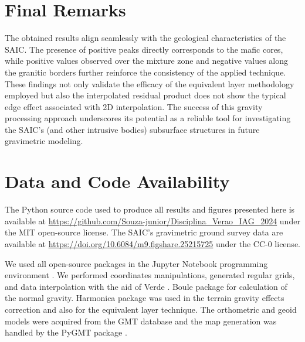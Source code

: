 \section{Final Remarks}
The obtained results align seamlessly with the geological characteristics of the SAIC. The presence of positive peaks directly corresponds to the mafic cores, while positive values observed over the mixture zone and negative values along the granitic borders further reinforce the consistency of the applied technique. These findings not only validate the efficacy of the equivalent layer methodology employed but also the interpolated residual product does not show the typical edge effect associated with 2D interpolation. The success of this gravity processing approach underscores its potential as a reliable tool for investigating the SAIC's (and other intrusive bodies) subsurface structures in future gravimetric modeling.

\newpage
\section*{Data and Code Availability}

The Python source code used to produce all results and figures presented here is available at \url{https://github.com/Souza-junior/Disciplina_Verao_IAG_2024} under the MIT open-source license. The SAIC's gravimetric ground survey data are available at \url{https://doi.org/10.6084/m9.figshare.25215725} under the CC-0 license.


We used all open-source packages in the Jupyter Notebook programming environment \citep{Kluyver2016}. We performed coordinates manipulations, generated regular grids, and data interpolation with the aid of Verde \citep{verde2018}. Boule package \citep{Boule2020} for calculation of the normal gravity. Harmonica package \citep{harmonica2020} was used in the terrain gravity effects correction and also for the equivalent layer technique. The orthometric and geoid models were acquired from the GMT database \citep{gmt} and the map generation was handled by the PyGMT package \citep{pygmt}.